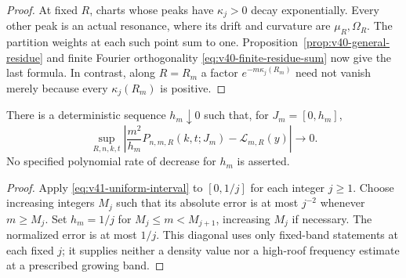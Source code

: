 \begin{proof}
At fixed $R$, charts whose peaks have $\kappa_j>0$ decay exponentially.
Every other peak is an actual resonance, where its drift and curvature
are $\mu_R,\Omega_R$. The partition weights at each such point sum
to one. Proposition~\ref{prop:v40-general-residue} and finite Fourier
orthogonality \eqref{eq:v40-finite-residue-sum} now give the last formula.
In contrast, along $R=R_m$ a factor $e^{-m\kappa_j(R_m)}$ need not
vanish merely because every $\kappa_j(R_m)$ is positive.
\end{proof}

\begin{corollary}
\label{cor:v41-shrinking-roof}
There is a deterministic sequence $h_m\downarrow0$ such that, for
$J_m=[0,h_m]$,
\[
 \sup_{R,n,k,t}
 \left|\frac{m^2}{h_m}P_{n,m,R}(k,t;J_m)-\mathcal L_{m,R}(y)\right|
                       \longrightarrow0.
\]
No specified polynomial rate of decrease for $h_m$ is asserted.
\end{corollary}
\begin{proof}
Apply \eqref{eq:v41-uniform-interval} to $[0,1/j]$ for each integer
$j\ge1$. Choose increasing integers $M_j$ such that its absolute error
is at most $j^{-2}$ whenever $m\ge M_j$. Set $h_m=1/j$ for
$M_j\le m<M_{j+1}$, increasing $M_j$ if necessary. The normalized
error is at most $1/j$. This diagonal uses only fixed-band statements
at each fixed $j$; it supplies neither a density value nor a high-roof
frequency estimate at a prescribed growing band.
\end{proof}
